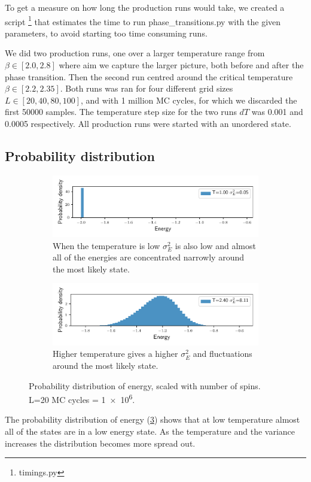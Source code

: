 To get a measure on how long the production runs would take, we created a script
\footnote{timings.py} that estimates the time to
run phase\_transitions.py with the given parameters, to avoid starting
too time consuming runs.

We did two production runs, one over a larger temperature range from $\beta \in
[2.0, 2.8]$ where aim we capture the larger picture, both before and after the
phase transition. Then the second run centred around the critical
temperature  $\beta \in [2.2, 2.35]$. Both runs was ran for four different grid
sizes $L \in [20,40,80,100]$, and with 1 million MC cycles, for which we
discarded the first 50000 samples. The temperature step size for the two runs
$dT$ was 0.001 and 0.0005 respectively. All production runs were started with
an unordered state.

\subsection{Probability distribution}

\begin{figure}[h]
  \begin{subfigure}[t]{\textwidth} %
    \centering
    \includegraphics[width=\linewidth]{../figures/distribution_0.pdf}
    \caption{When the temperature is low $\sigma_E^2$ is also low and almost all
    of the energies are concentrated narrowly around the most likely
    state.}
    \label{fig:sub-first}
  \end{subfigure}
  \hfill
  \newline
  \begin{subfigure}[t]{\textwidth}
    \centering
    \includegraphics[width=\linewidth]{../figures/distribution_5.pdf}
    \caption{Higher temperature gives a higher $\sigma_E^2$ and fluctuations around
    the most likely state.}
    \label{fig:sub-second}
  \end{subfigure}
  \label{fig:distribution}
  \caption{Probability distribution of energy, scaled with number of spins. L=20
  MC cycles = \num{1e6}.}
\end{figure}


The probability distribution of energy (\cref{fig:distribution}) shows that
at low temperature almost all of the states are in a low energy state.
As the temperature and the variance increases the distribution becomes more
spread out.
